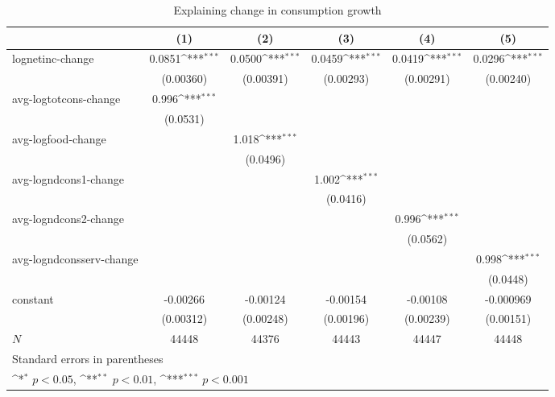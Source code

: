 \begin{table}[!h]\centering
\def\sym#1{\ifmmode^{#1}\else\(^{#1}\)\fi}
\caption{\label{tab:2.2A-logdeltacons} Explaining change in consumption growth}
\begin{tabular}{l*{5}{c}}
\hline\hline
            &\multicolumn{1}{c}{(1)}         &\multicolumn{1}{c}{(2)}         &\multicolumn{1}{c}{(3)}         &\multicolumn{1}{c}{(4)}         &\multicolumn{1}{c}{(5)}         \\
\hline
lognetinc-change&      0.0851\sym{***}&      0.0500\sym{***}&      0.0459\sym{***}&      0.0419\sym{***}&      0.0296\sym{***}\\
            &   (0.00360)         &   (0.00391)         &   (0.00293)         &   (0.00291)         &   (0.00240)         \\
avg-logtotcons-change&       0.996\sym{***}&                     &                     &                     &                     \\
            &    (0.0531)         &                     &                     &                     &                     \\
avg-logfood-change&                     &       1.018\sym{***}&                     &                     &                     \\
            &                     &    (0.0496)         &                     &                     &                     \\
avg-logndcons1-change&                     &                     &       1.002\sym{***}&                     &                     \\
            &                     &                     &    (0.0416)         &                     &                     \\
avg-logndcons2-change&                     &                     &                     &       0.996\sym{***}&                     \\
            &                     &                     &                     &    (0.0562)         &                     \\
avg-logndconsserv-change&                     &                     &                     &                     &       0.998\sym{***}\\
            &                     &                     &                     &                     &    (0.0448)         \\
constant    &    -0.00266         &    -0.00124         &    -0.00154         &    -0.00108         &   -0.000969         \\
            &   (0.00312)         &   (0.00248)         &   (0.00196)         &   (0.00239)         &   (0.00151)         \\
\hline
\(N\)       &       44448         &       44376         &       44443         &       44447         &       44448         \\
\hline\hline
\multicolumn{6}{l}{\footnotesize Standard errors in parentheses}\\
\multicolumn{6}{l}{\footnotesize \sym{*} \(p<0.05\), \sym{**} \(p<0.01\), \sym{***} \(p<0.001\)}\\
\end{tabular}
\end{table}
